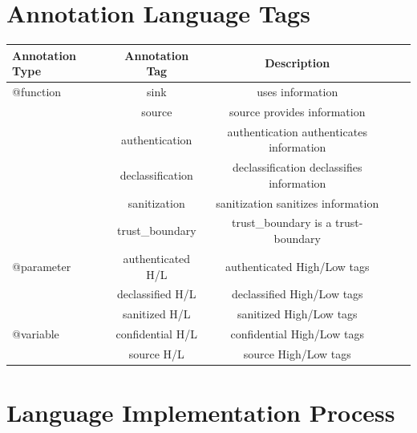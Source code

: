 \section{Annotation Language Tags}
\begin{tabular}{l*{3}{c}r}
	\hline
	Annotation Type   & Annotation Tag & Description  \\
	\hline
	@function         & sink  		   & uses information \\
	                  & source         & source provides information	\\
	                  & authentication & authentication authenticates information	\\
	                  & declassification& declassification declassifies information	\\
	                  & sanitization   & sanitization sanitizes information	\\
	                  & trust\_boundary& trust\_boundary is a trust-boundary\\ \hline

	@parameter        & authenticated H/L & authenticated High/Low tags    \\
					  & declassified H/L  & declassified High/Low tags    \\
				      & sanitized H/L     & sanitized High/Low tags    \\ \hline
	@variable         & confidential H/L & confidential High/Low tags\\
					  & source H/L & source High/Low tags   \\
	\hline
\end{tabular}

\section{Language Implementation Process}

